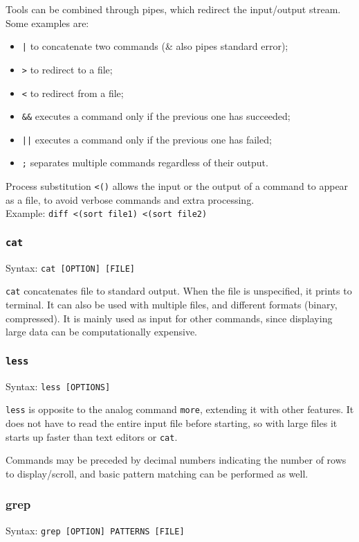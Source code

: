 Tools can be combined through pipes, which redirect the input/output stream. Some examples are:
\begin{itemize}
	\item \texttt{|} to concatenate two commands (\& also pipes standard error);
	\item \texttt{>} to redirect to a file;
	\item \texttt{<} to redirect from a file;
	\item \texttt{\&\&} executes a command only if the previous one has succeeded;
	\item \texttt{||} executes a command only if the previous one has failed;
	\item \texttt{;} separates multiple commands regardless of their output.
\end{itemize}

Process substitution \texttt{<()} allows the input or the output of a command to appear as a file, to avoid verbose commands and extra processing. \\
Example: \texttt{diff <(sort file1) <(sort file2)}

\subsubsection{\texttt{cat}}
Syntax: \texttt{cat [OPTION] [FILE]}

\texttt{cat} concatenates file to standard output. When the file is unspecified, it prints to terminal. It can also be used with multiple files, and different formats (binary, compressed). It is mainly used as input for other commands, since displaying large data can be computationally expensive.

\subsubsection{\texttt{less}}
Syntax: \texttt{less [OPTIONS]}

\texttt{less} is opposite to the analog command \texttt{more}, extending it with other features. It does not have to read the entire input file before starting, so with large files it starts up faster than text editors or \texttt{cat}. 

Commands may be preceded by decimal numbers indicating the number of rows to display/scroll, and basic pattern matching can be performed as well. 

\subsubsection{grep}
Syntax: \texttt{grep [OPTION] PATTERNS [FILE]}

